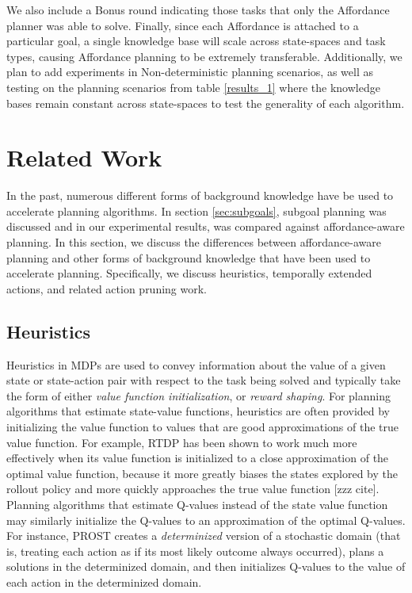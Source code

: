 \documentclass[]{article}
\begin{document}
We also include a Bonus round indicating
those tasks that only the Affordance planner was able to solve. Finally, since
each Affordance is attached to a particular goal, a single knowledge base will
scale across state-spaces and task types, causing Affordance planning to be
extremely transferable. Additionally, we plan to add experiments in
Non-deterministic planning scenarios, as well as testing on the planning scenarios
from table \ref{results_1} where the knowledge bases remain constant across
state-spaces to test the generality of each algorithm.






\section{Related Work}
In the past, numerous different forms of background knowledge have be used to 
accelerate planning algorithms. In section \ref{sec:subgoals}, subgoal
planning was discussed and in our experimental results, was compared against affordance-aware planning. 
In this section, we discuss the differences between affordance-aware planning and other
forms of background knowledge that have been used to accelerate planning.
Specifically, we discuss heuristics, temporally extended actions, and related action pruning work.


\subsection{Heuristics}
Heuristics in MDPs are used to convey information about the value of a given state or state-action pair with respect to the task being solved and typically take the form of either {\em value function initialization},
or {\em reward shaping}. For planning algorithms that estimate state-value functions, heuristics are often
provided by initializing the value function to values that are good approximations of the true value function. For example, RTDP has been shown to work much more effectively when its value function is initialized to a close approximation of the optimal value function, because it more greatly biases the states explored by the rollout policy and more quickly approaches the true value function [zzz cite]. Planning algorithms that estimate Q-values instead of the state value function may similarly initialize the Q-values to an approximation of the optimal Q-values. For instance, PROST creates a {\em determinized} version of a stochastic domain (that is, treating each action as if its most likely outcome always occurred), plans a solutions in the determinized domain, and then initializes Q-values to the value of each action in the determinized domain.
\end{document}
